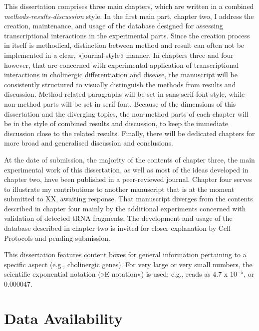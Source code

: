 
This dissertation comprises three main chapters, which are written in a combined \emph{methods-results-discussion} style. In the first main part, chapter two, I address the creation, maintenance, and usage of the database designed for assessing transcriptional interactions in the experimental parts. Since the creation process in itself is methodical, distinction between method and result can often not be implemented in a clear, »journal-style« manner. In chapters three and four however, that are concerned with experimental application of transcriptional interactions in cholinergic differentiation and disease, the manuscript will be consistently structured to visually distinguish the methods from results and discussion. Method-related paragraphs will be set in sans-serif font style, while non-method parts will be set in serif font. Because of the dimensions of this dissertation and the diverging topics, the non-method parts of each chapter will be in the style of combined results and discussion, to keep the immediate discussion close to the related results. Finally, there will be dedicated chapters for more broad and generalised discussion and conclusions.

At the date of submission, the majority of the contents of chapter three, the main experimental work of this dissertation, as well as most of the ideas developed in chapter two, have been published in a peer-reviewed journal.\cite{Lobentanzer2019a} Chapter four serves to illustrate my contributions to another manuscript that is at the moment submitted to XX, awaiting response.\cite{Winek2020} That manuscript diverges from the contents described in chapter four mainly by the additional experiments concerned with validation of detected tRNA fragments. The development and usage of the database described in chapter two is invited for closer explanation by Cell Protocols and pending submission.\cite{Lobentanzer2020}

This dissertation features content boxes for general information pertaining to a specific aspect (e.g., cholinergic genes). For very large or very small numbers, the scientific exponential notation (»E notation«) is used; e.g.,  reads as 4.7 x 10$^{-5}$, or 0.000047.

\newpage
\chapter*{Data Availability}
